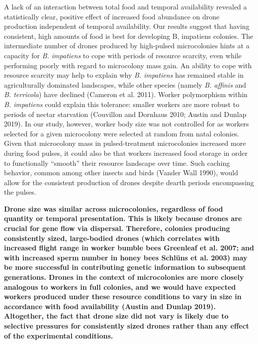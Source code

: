 \documentclass[11pt,]{article}
\begin{document}
A lack of an interaction between total food and temporal availability
revealed a statistically clear, positive effect of increased food
abundance on drone production independent of temporal availability. Our
results suggest that having consistent, high amounts of food is best for
developing B, impatiens colonies. The intermediate number of drones
produced by high-pulsed microcolonies hints at a capacity for \emph{B.
impatiens} to cope with periods of resource scarcity, even while
performing poorly with regard to microcolony mass gain. An ability to
cope with resource scarcity may help to explain why \emph{B. impatiens}
has remained stable in agriculturally dominated landscapes, while other
species (namely \emph{B. affinis} and \emph{B. terricola}) have declined
(Cameron et al. 2011). Worker polymorphism within \emph{B. impatiens}
could explain this tolerance: smaller workers are more robust to periods
of nectar starvation (Couvillon and Dornhaus 2010; Austin and Dunlap
2019). In our study, however, worker body size was not controlled for as
workers selected for a given microcolony were selected at random from
natal colonies. Given that microcolony mass in pulsed-treatment
microcolonies increased more during food pulses, it could also be that
workers increased food storage in order to functionally ``smooth'' their
resource landscape over time. Such caching behavior, common among other
insects and birds (Vander Wall 1990), would allow for the consistent
production of drones despite dearth periods encompassing the pulses.

\textbf{Drone size was similar across microcolonies, regardless of food
quantity or temporal presentation. This is likely because drones are
crucial for gene flow via dispersal. Therefore, colonies producing
consistently sized, large-bodied drones (which correlates with increased
flight range in worker bumble bees Greenleaf et al. 2007; and with
increased sperm number in honey bees Schlüns et al. 2003) may be more
successful in contributing genetic information to subsequent
generations. Drones in the context of microcolonies are more closely
analogous to workers in full colonies, and we would have expected
workers produced under these resource conditions to vary in size in
accordance with food availability (Austin and Dunlap 2019). Altogether,
the fact that drone size did not vary is likely due to selective
pressures for consistently sized drones rather than any effect of the
experimental conditions.}
\end{document}
